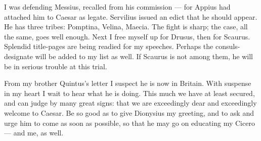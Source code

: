  I was defending Messius, recalled from his commission --- for Appius had attached him to Caesar as legate. Servilius issued an edict that he should appear. He has three tribes: Pomptina, Velina, Maecia. The fight is sharp; the case, all the same, goes well enough. Next I free myself up for Drusus, then for Scaurus. Splendid title-pages are being readied for my speeches. Perhaps the consuls-designate will be added to my list as well. If Scaurus is not among them, he will be in serious trouble at this trial.

 From my brother Quintus's letter I suspect he is now in Britain. With suspense in my heart I wait to hear what he is doing. This much we have at least secured, and can judge by many great signs: that we are exceedingly dear and exceedingly welcome to Caesar. Be so good as to give Dionysius my greeting, and to ask and urge him to come as soon as possible, so that he may go on educating my Cicero --- and me, as well.
